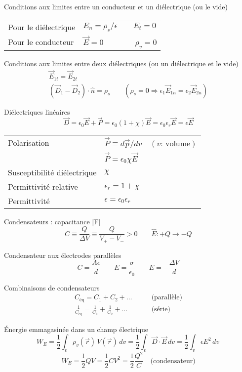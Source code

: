 \documentclass[10pt,landscape]{article}
\newcommand{\extraline}{\vspace{1em}}
\newcommand{\halfline}{\vspace{0.5em}}
\newcommand{\tableindent}{\hspace{1.5em}}
\newcommand{\uvec}[1]{\ensuremath{{\hat{#1}}}}
\begin{document}
\begin{multicols}{3}
Conditions aux limites entre un conducteur et un diélectrique  (ou le vide)\\
\halfline
\begin{tabular}{@{\tableindent}ll@{}}
	Pour le diélectrique & $ E_n = {\rho_s}/{\epsilon} \qquad E_t = 0 $ \\
	Pour le conducteur  & $\vec{E} = 0 \qquad\qquad \rho_v = 0 $ \\
\end{tabular}

\extraline
Conditions aux limites entre deux diélectriques (ou un diélectrique et le vide)
\begin{gather*}
\vec{E}_{1t} =\vec{ E}_{2t}  \\
 (\vec{D}_1 - \vec{D}_2) \cdot \uvec{n} = \rho_s  \qquad (\rho_s=0 \Rightarrow \epsilon_1 \vec{E}_{1n} = \epsilon_2 \vec{E}_{2n})
\end{gather*}

\halfline
Diélectriques linéaires
\[ \vec{D} = \epsilon_0\vec{E} + \vec{P} = \epsilon_0(1+\chi)\vec{E} = \epsilon_0\epsilon_r\vec{E} = \epsilon\vec{E}  \]
\begin{tabular}{@{\tableindent}ll@{}}
	Polarisation  & $\vec{P} \equiv d\vec{p}/dv \quad (\text{$v$: volume})$ \\
	  & $\vec{P} = \epsilon_0\chi\vec{E}$ \\
	Susceptibilité diélectrique  & $\chi$ \\
	Permittivité relative &  $\epsilon_r=1+\chi$ \\
	Permittivité & $\epsilon = \epsilon_0\epsilon_r$
\end{tabular}

\extraline
Condensateurs : capacitance [\si{\farad}] 
\[ C \equiv \frac{Q}{\Delta V} \equiv \frac{Q}{V_+ - V_-} > 0 
\qquad \uvec{E}: +Q \to -Q \]

Condensateur aux électrodes parallèles \[ C = \frac{A\epsilon}{d} 
\qquad 
E = \frac{\sigma}{\epsilon_0}
\qquad
E =  -\frac{\Delta V}{d} \]

Combinaisons de condensateurs \begin{align*}
C_\text{éq} = C_1 + C_2 + \dots  \qquad &\text{(parallèle)} \\
\frac{1}{C_\text{éq}} = \frac{1}{C_1} + \frac{1}{C_2} + \dots \qquad &\text{(série)}
\end{align*}


\halfline
Énergie emmagasinée dans un champ électrique
\[ W_E = \frac{1}{2} \int_v  \rho_v(\vec{r})  \, V(\vec{r}) \, dv 
= \frac{1}{2} \int_v  \vec{D}\cdot\vec{E} \, dv 
= \frac{1}{2} \int_v  \epsilon E^2 \, dv 
\frac{}{}\]
\[ W_E = \frac{1}{2} QV = \frac{1}{2} CV^2 = \frac{1}{2}\frac{Q^2}{C} \quad\text{(condensateur)} \]


\end{multicols}
\end{document}

